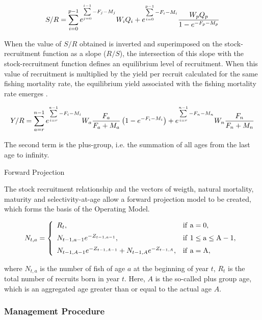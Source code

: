 \documentclass[preprint,12pt]{elsarticle}
\begin{document}
\begin{equation}
S/R=\sum\limits_{i=0}^{p-1} {e^{\sum\limits_{j=0}^{i-1} {-F_j-M_j}}} W_i Q_i + e^{\sum\limits_{i=0}^{p-1} {-F_i-M_i}} \frac{W_p Q_p}{1-e^{-F_p-M_p}}\\
\end{equation} 

When the value of $S/R$ obtained is inverted and superimposed on the stock-recruitment function as a slope ($R/S$), the intersection of this slope with the stock-recruitment function defines an equilibrium level of recruitment. When this value of recruitment is multiplied by the yield per recruit calculated for the same fishing mortality rate, the equilibrium yield associated with the fishing mortality rate emerges \cite{gabriel1999review}. 

\begin{equation}
Y/R=\sum\limits_{a=r}^{n-1} {e^{\sum\limits_{i=r}^{a-1} {-F_i-M_i}}} W_a\frac{F_a}{F_a+M_a}\left(1-e^{-F_i-M_i} \right) + e^{\sum\limits_{i=r}^{n-1} {-F_n-M_n}} W_n\frac{F_n}{F_n+M_n}\\
\end{equation} 

The second term is the plus-group, i.e. the summation of all ages from the last age to infinity. 

Forward Projection

The stock recruitment relationship and the vectors of weigth, natural mortality, maturity and selectivity-at-age allow a forward projection model to be created, which forms the basis of the Operating Model.

\begin{equation}
N_{t,a} =
\left\{
\begin{array}{ll}
\vspace{0.2cm}
R_t, & \rm{if} \ a=0,\\
\vspace{0.2cm}
N_{t-1,a-1} e^{-Z_{t-1,a-1}}, & \rm{if} \ 1 \leq a \leq A-1,\\
N_{t-1,A-1} e^{-Z_{t-1,A-1}}+N_{t-1,A} e^{-Z_{t-1,A}}, & \rm{if} \ a=A,
\end{array}
\right.
\end{equation}

where $N_{t,a}$ is the number of fish of age $a$ at the beginning of year $t$, $R_t$ is the total number of recruits born in year $t$. Here, $A$ is the so-called plus group age, which is an aggregated age greater than or equal to the actual age $A$.


\subsubsection{Management Procedure}
\end{document}
